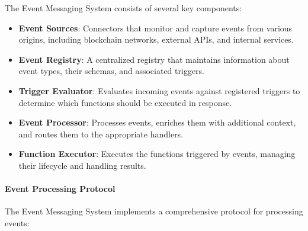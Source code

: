 The Event Messaging System consists of several key components:

\begin{itemize}
    \item \textbf{Event Sources}: Connectors that monitor and capture events from various origins, including blockchain networks, external APIs, and internal services.
    
    \item \textbf{Event Registry}: A centralized registry that maintains information about event types, their schemas, and associated triggers.
    
    \item \textbf{Trigger Evaluator}: Evaluates incoming events against registered triggers to determine which functions should be executed in response.
    
    \item \textbf{Event Processor}: Processes events, enriches them with additional context, and routes them to the appropriate handlers.
    
    \item \textbf{Function Executor}: Executes the functions triggered by events, managing their lifecycle and handling results.
\end{itemize}

\paragraph{Event Processing Protocol}
The Event Messaging System implements a comprehensive protocol for processing events:

